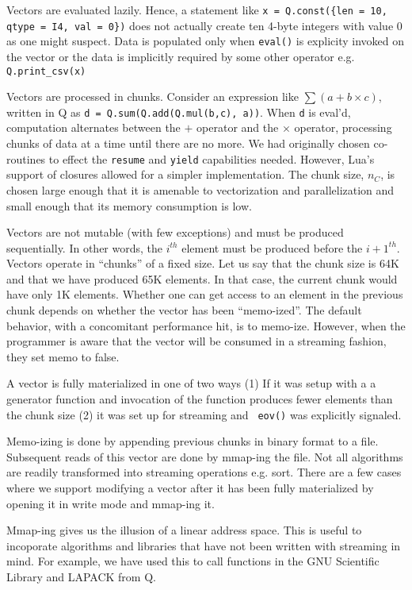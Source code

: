 Vectors are evaluated lazily. Hence, a statement like 
{\tt x = Q.const(\{len = 10, qtype = I4, val = 0\})} does not actually create
ten
4-byte integers with value 0 as one might suspect. Data is populated only when
{\tt eval()} is explicity invoked on the vector or the data is 
implicitly required by some other operator e.g. {\tt Q.print\_csv(x)}

Vectors are processed in chunks. Consider an expression  like \(\sum (a + b\times
c)\), written in Q as {\tt d = Q.sum(Q.add(Q.mul(b,c), a))}.
When {\tt d} is eval'd, computation alternates between the \(+\) operator
and the \(\times\) operator, processing chunks of data at a time until there are
no more.
We had originally chosen co-routines to effect the {\tt resume} and
{\tt yield} capabilities needed. However, Lua's support of closures allowed for
a simpler implementation.
The chunk size, \(n_C\), is chosen large enough that it is amenable to
vectorization and parallelization and small enough that its memory consumption
is low.

Vectors are not mutable (with few exceptions)
and must be produced sequentially. In other words, the \(i^{th}\) element must
be produced before the \({i+1}^{th}\). Vectors
operate in ``chunks'' of a fixed size. Let us say that the chunk size is 64K and
that we have produced 65K elements. In that case, the current chunk would have
only 1K elements. Whether one can get access to an element in the previous chunk
depends on whether the vector has been ``memo-ized''. The default behavior, with
a concomitant performance hit, is to memo-ize. However, when the programmer is
aware that the vector will be consumed in a streaming fashion, they set memo
to false. 

A vector is fully materialized in one of two ways (1) If it was setup with a a generator function and invocation of the function produces 
fewer elements than the chunk size (2) it was set up for streaming and {\tt
eov()} was explicitly signaled.

Memo-izing is done by appending previous chunks in binary format to a file.
Subsequent reads of this vector are done by mmap-ing the file. Not all
algorithms are readily transformed into streaming operations e.g. sort. There
are a few cases where we support modifying a vector after it has been fully
materialized by opening it in write mode and mmap-ing it.

Mmap-ing gives us the illusion of a linear address space. This is useful to
incoporate algorithms and libraries that have not been written with streaming in
mind. For example, we have used this to call functions in the GNU Scientific
Library and LAPACK from Q.

